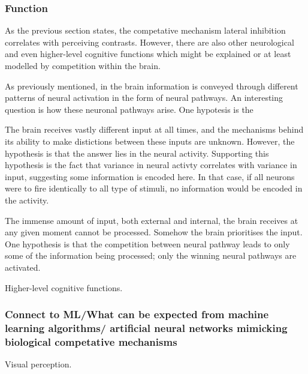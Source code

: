         \subsubsection{Function}
            As the previous section states, the competative mechanism lateral inhibition correlates with perceiving contrasts. However, there are also other neurological and even higher-level cognitive functions which might be explained or at least modelled by competition within the brain.

            As previously mentioned, in the brain information is conveyed through different patterns of neural activation in the form of neural pathways. An interesting question is how these neuronal pathways arise. One hypotesis is the 
            
            The brain receives vastly different input at all times, and the mechanisms behind its ability to make distictions between these inputs are unknown. However, the  hypothesis is that the answer lies in the neural activity. Supporting this hypothesis is the fact that variance in neural activty correlates with variance in input, suggesting some information is encoded here. In that case, if all neurons were to fire identically to all type of stimuli, no information would be encoded in the activity.

            The immense amount of input, both external and internal, the brain receives at any given moment cannot be processed. Somehow the brain prioritises the input. One hypothesis is that the competition between neural pathway leads to only some of the information being processed; only the winning neural pathways are activated.  
            
            Higher-level cognitive functions. 


        \subsubsection{Connect to ML/What can be expected from machine learning algorithms/ artificial neural networks mimicking biological competative mechanisms}
            Visual perception. 
    
        
